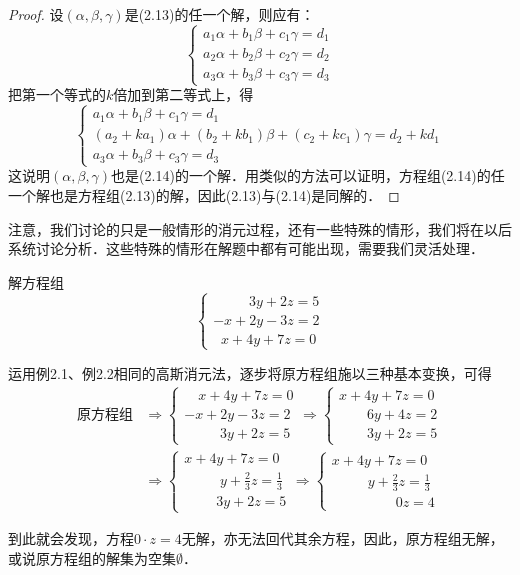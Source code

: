 \begin{proof}
    设$(\alpha,\beta,\gamma)$是(2.13)的任一个解，则应有：
\[    \begin{cases}
    a_1\alpha+b_1\beta+c_1\gamma=d_1\\   
     a_2\alpha+b_2\beta+c_2\gamma=d_2\\    
    a_3\alpha+b_3\beta+c_3\gamma=d_3
  \end{cases}\]
把第一个等式的$k$倍加到第二等式上，得
\[    \begin{cases}
    a_1\alpha+b_1\beta+c_1\gamma=d_1\\  
     (a_2+ka_1)\alpha+(b_2+kb_1)\beta+(c_2+kc_1)\gamma=d_2+kd_1\\
    a_3\alpha+b_3\beta+c_3\gamma=d_3
\end{cases} \]
这说明$(\alpha,\beta,\gamma)$也是(2.14)的一个解．用类似的方法可以证明，方程组(2.14)的任一个解也是方程组(2.13)的解，因此(2.13)与(2.14)是同解的．
\end{proof}

注意，我们讨论的只是一般情形的消元过程，还有一些特殊的情形，我们将在以后系统讨论分析．这些特殊的情形在解题中都有可能出现，需要我们灵活处理．

\begin{example}
    解方程组
    \[\begin{cases}
     \qquad \;\; 3y+2z=5\\-x+2y-3z=2\\\;\; x+4y+7z=0 
    \end{cases}\]
\end{example}


\begin{solution}
运用例2.1、例2.2相同的高斯消元法，逐步将原方程组施以三种基本变换，可得
\[\begin{split}
\text{原方程组}& \Rightarrow \begin{cases}
  \quad   x+4y+7z=0\\-x+2y-3z=2\\\qquad \;\;3y+2z=5
\end{cases} \Rightarrow \begin{cases}
    x+4y+7z=0\\\qquad  6y+4z=2\\\qquad  3y+2z=5
\end{cases}\\
&\Rightarrow \begin{cases}
    x+4y+7z=0\\\qquad \;\; y+\frac{2}{3}z=\frac{1}{3}\\\qquad \;3y+2z=5 
\end{cases}\Rightarrow \begin{cases}
    x+4y+7z=0\\\qquad \;\;y+\frac{2}{3}z=\frac{1}{3}\\\qquad \;\;\qquad  0z=4
\end{cases}
\end{split}\]

到此就会发现，方程$0\cdot z=4$无解，亦无法回代其余方程，因此，原方程组无解，或说原方程组的解集为空集$\emptyset$．
\end{solution}
    
